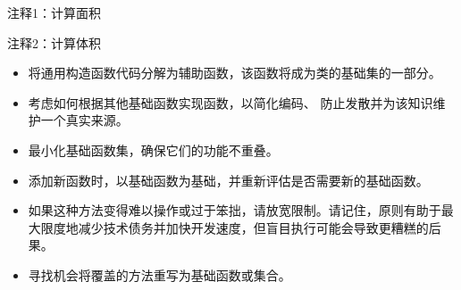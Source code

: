 {\footnotesize
注释1：计算面积

注释2：计算体积
}


\begin{itemize}
\item
将通用构造函数代码分解为辅助函数，该函数将成为类的基础集的一部分。

\item
考虑如何根据其他基础函数实现函数，以简化编码、 防止发散并为该知识维护一个真实来源。

\item
最小化基础函数集，确保它们的功能不重叠。

\item
添加新函数时，以基础函数为基础，并重新评估是否需要新的基础函数。

\item
如果这种方法变得难以操作或过于笨拙，请放宽限制。请记住，原则有助于最大限度地减少技术债务并加快开发速度，但盲目执行可能会导致更糟糕的后果。

\item
寻找机会将覆盖的方法重写为基础函数或集合。
\end{itemize}























